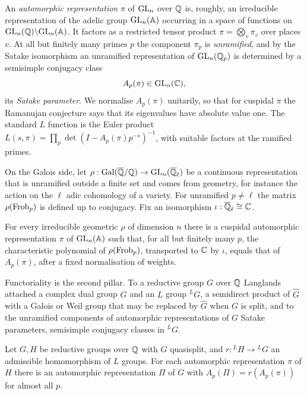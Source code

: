 An \emph{automorphic representation} $\pi$ of $\mathrm{GL}_n$ over $\mathbb{Q}$ is, roughly, an irreducible representation of the adelic group $\mathrm{GL}_n(\mathbb{A})$ occurring in a space of functions on $\mathrm{GL}_n(\mathbb{Q})\backslash\mathrm{GL}_n(\mathbb{A})$. It factors as a restricted tensor product $\pi=\bigotimes_v\pi_v$ over places $v$. At all but finitely many primes $p$ the component $\pi_p$ is \emph{unramified}, and by the Satake isomorphism an unramified representation of $\mathrm{GL}_n(\mathbb{Q}_p)$ is determined by a semisimple conjugacy class
\[
A_p(\pi)\in\mathrm{GL}_n(\mathbb{C}),
\]
its \emph{Satake parameter}. We normalise $A_p(\pi)$ unitarily, so that for cuspidal $\pi$ the Ramanujan conjecture says that its eigenvalues have absolute value one. The standard $L$ function is the Euler product $L(s,\pi)=\prod_p\det(I-A_p(\pi)p^{-s})^{-1}$, with suitable factors at the ramified primes.

On the Galois side, let $\rho:\operatorname{Gal}(\overline{\mathbb{Q}}/\mathbb{Q})\to\mathrm{GL}_n(\overline{\mathbb{Q}}_\ell)$ be a continuous representation that is unramified outside a finite set and comes from geometry, for instance the action on the $\ell$ adic cohomology of a variety. For unramified $p\neq\ell$ the matrix $\rho(\operatorname{Frob}_p)$ is defined up to conjugacy. Fix an isomorphism $\iota:\overline{\mathbb{Q}}_\ell\cong\mathbb{C}$.

\begin{conjecture}[Reciprocity]
For every irreducible geometric $\rho$ of dimension $n$ there is a cuspidal automorphic representation $\pi$ of $\mathrm{GL}_n(\mathbb{A})$ such that, for all but finitely many $p$, the characteristic polynomial of $\rho(\operatorname{Frob}_p)$, transported to $\mathbb{C}$ by $\iota$, equals that of $A_p(\pi)$, after a fixed normalisation of weights.
\end{conjecture}

Functoriality is the second pillar. To a reductive group $G$ over $\mathbb{Q}$ Langlands attached a complex dual group $\widehat G$ and an $L$ group ${}^LG$, a semidirect product of $\widehat G$ with a Galois or Weil group that may be replaced by $\widehat G$ when $G$ is split, and to the unramified components of automorphic representations of $G$ Satake parameters, semisimple conjugacy classes in ${}^LG$.

\begin{conjecture}[Functoriality]
Let $G,H$ be reductive groups over $\mathbb{Q}$ with $G$ quasisplit, and $r:{}^LH\to{}^LG$ an admissible homomorphism of $L$ groups. For each automorphic representation $\pi$ of $H$ there is an automorphic representation $\Pi$ of $G$ with $A_p(\Pi)=r(A_p(\pi))$ for almost all $p$.
\end{conjecture}


